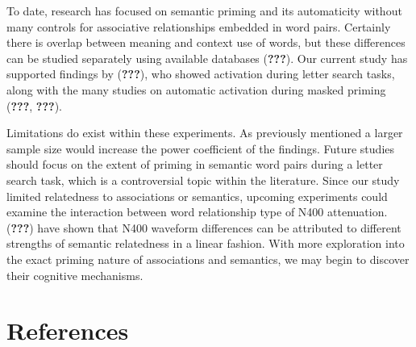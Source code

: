 \documentclass[english,man]{apa6}
\theoremstyle{definition}
\theoremstyle{definition}
\theoremstyle{definition}
\theoremstyle{remark}
\begin{document}
To date, research has focused on semantic priming and its automaticity
without many controls for associative relationships embedded in word
pairs. Certainly there is overlap between meaning and context use of
words, but these differences can be studied separately using available
databases ({\textbf{???}}). Our current study has supported findings by
({\textbf{???}}), who showed activation during letter search tasks,
along with the many studies on automatic activation during masked
priming ({\textbf{???}}, {\textbf{???}}).

Limitations do exist within these experiments. As previously mentioned a
larger sample size would increase the power coefficient of the findings.
Future studies should focus on the extent of priming in semantic word
pairs during a letter search task, which is a controversial topic within
the literature. Since our study limited relatedness to associations or
semantics, upcoming experiments could examine the interaction between
word relationship type of N400 attenuation. ({\textbf{???}}) have shown
that N400 waveform differences can be attributed to different strengths
of semantic relatedness in a linear fashion. With more exploration into
the exact priming nature of associations and semantics, we may begin to
discover their cognitive mechanisms.

\newpage

\section{References}\label{references}

\setlength{\parindent}{-0.5in} \setlength{\leftskip}{0.5in}
\end{document}

